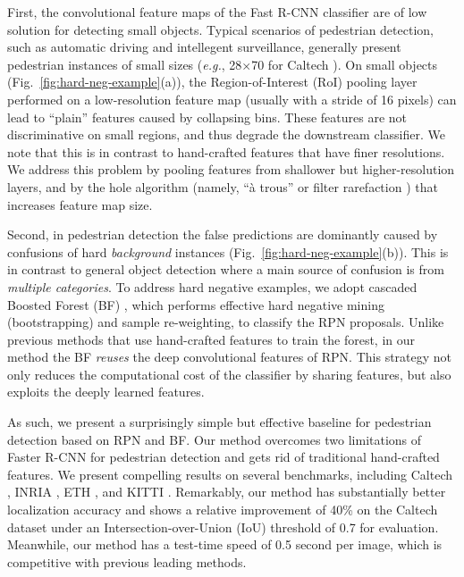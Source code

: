 \documentclass[runningheads]{llncs}
\def\eg{\emph{e.g.}}
\begin{document}
First, the convolutional feature maps of the Fast R-CNN classifier are of low solution for detecting small objects. Typical scenarios of pedestrian detection, such as automatic driving and intellegent surveillance, generally present pedestrian instances of small sizes (\eg, 28$\times$70 for Caltech \cite{dollar2012pedestrian}). On small objects (Fig.~\ref{fig:hard-neg-example}(a)), the Region-of-Interest (RoI) pooling layer \cite{he14ECCV,girshickICCV15fastrcnn} performed on a low-resolution feature map (usually with a stride of 16 pixels) can lead to ``plain'' features caused by collapsing bins. These features are not discriminative on small regions, and thus degrade the downstream classifier. We note that this is in contrast to hand-crafted features that have finer resolutions.
We address this problem by pooling features from shallower but higher-resolution layers, and by the hole algorithm (namely, ``{\`a} trous'' \cite{chen2014semantic} or filter rarefaction \cite{long2015fully}) that increases feature map size.

Second, in pedestrian detection the false predictions are dominantly caused by confusions of hard \emph{background} instances (Fig.~\ref{fig:hard-neg-example}(b)). This is in contrast to general object detection where a main source of confusion is from \emph{multiple categories}. To address hard negative examples, we adopt cascaded Boosted Forest (BF) \cite{friedman2000additive,appel2013quickly}, which performs effective hard negative mining (bootstrapping) and sample re-weighting, to classify the RPN proposals. Unlike previous methods that use hand-crafted features to train the forest, in our method the BF \emph{reuses} the deep convolutional features of RPN. This strategy not only reduces the computational cost of the classifier by sharing features, but also exploits the deeply learned features.

As such, we present a surprisingly simple but effective baseline for pedestrian detection based on RPN and BF. Our method overcomes two limitations of Faster R-CNN for pedestrian detection and gets rid of traditional hand-crafted features. We present compelling results on several benchmarks, including Caltech \cite{dollar2012pedestrian}, INRIA \cite{dalal2005histograms}, ETH \cite{ess2007depth}, and KITTI \cite{geiger2012kitti}. Remarkably, our method has substantially better localization accuracy and shows a relative improvement of 40\% on the Caltech dataset under an Intersection-over-Union (IoU) threshold of 0.7 for evaluation.
Meanwhile, our method has a test-time speed of 0.5 second per image, which is competitive with previous leading methods.
\end{document}
